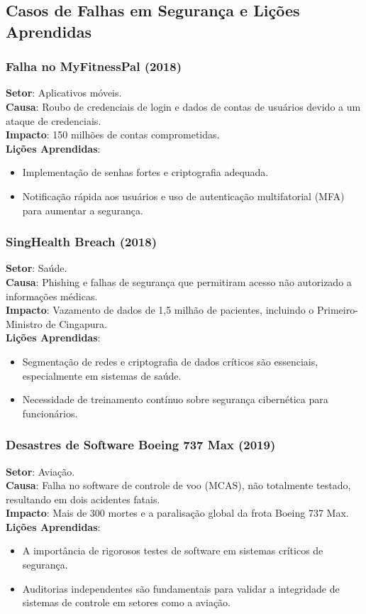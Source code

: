 \documentclass[12pt,oneside,a4paper,article]{abntex2}
\begin{document}
\subsection{Casos de Falhas em Segurança e Lições Aprendidas}

\subsubsection{Falha no MyFitnessPal (2018)}
\textbf{Setor}: Aplicativos móveis. \\
\textbf{Causa}: Roubo de credenciais de login e dados de contas de usuários devido a um ataque de credenciais. \\
\textbf{Impacto}: 150 milhões de contas comprometidas. \\
\textbf{Lições Aprendidas}: 
\begin{itemize}
    \item Implementação de senhas fortes e criptografia adequada.
    \item Notificação rápida aos usuários e uso de autenticação multifatorial (MFA) para aumentar a segurança.
\end{itemize}

\subsubsection{SingHealth Breach (2018)}
\textbf{Setor}: Saúde. \\
\textbf{Causa}: Phishing e falhas de segurança que permitiram acesso não autorizado a informações médicas. \\
\textbf{Impacto}: Vazamento de dados de 1,5 milhão de pacientes, incluindo o Primeiro-Ministro de Cingapura. \\
\textbf{Lições Aprendidas}: 
\begin{itemize}
    \item Segmentação de redes e criptografia de dados críticos são essenciais, especialmente em sistemas de saúde.
    \item Necessidade de treinamento contínuo sobre segurança cibernética para funcionários.
\end{itemize}


\subsubsection{Desastres de Software Boeing 737 Max (2019)}
\textbf{Setor}: Aviação. \\
\textbf{Causa}: Falha no software de controle de voo (MCAS), não totalmente testado, resultando em dois acidentes fatais. \\
\textbf{Impacto}: Mais de 300 mortes e a paralisação global da frota Boeing 737 Max. \\
\textbf{Lições Aprendidas}: 
\begin{itemize}
    \item A importância de rigorosos testes de software em sistemas críticos de segurança.
    \item Auditorias independentes são fundamentais para validar a integridade de sistemas de controle em setores como a aviação.
\end{itemize}
\end{document}
